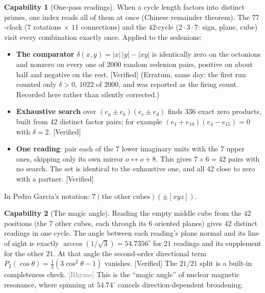 \documentclass[11pt]{article}
\newcommand{\verified}{\textsf{\small\textcolor{verif}{[Verified]}}}
\newcommand{\rhyme}{\textsf{\small\textcolor{gray}{[Rhyme]}}}
\theoremstyle{definition}\newtheorem{claim}{Capability}
\theoremstyle{remark}
\begin{document}
\begin{claim}[One-pass readings]\label{c:reading}
When a cycle length factors into distinct primes, one index reads all of them at once (Chinese remainder theorem). The $77$-clock ($7$ rotations $\times$ $11$ connections) and the $42$-cycle ($2\cdot3\cdot7$: sign, plane, cube) visit every combination exactly once. Applied to the sedenions:
\begin{itemize}[nosep]
\item \textbf{The comparator} $\delta(x,y)=|x|\,|y|-|xy|$ is identically zero on the octonions and nonzero on every one of $2000$ random sedenion pairs, positive on about half and negative on the rest. \verified{} (Erratum, same day: the first run counted only $\delta>0$, $1022$ of $2000$, and was reported as the firing count. Recorded here rather than silently corrected.)
\item \textbf{Exhaustive search} over $(e_a\pm e_b)(e_c\pm e_d)$ finds $336$ exact zero products, built from $42$ distinct factor pairs; for example $(e_1+e_{10})(e_4-e_{15})=0$ with $\delta=2$. \verified
\item \textbf{One reading}: pair each of the $7$ lower imaginary units with the $7$ upper ones, skipping only its own mirror $o\leftrightarrow o+8$. This gives $7\times6=42$ pairs with no search. The set is identical to the exhaustive one, and all $42$ close to zero with a partner. \verified
\end{itemize}
In Pedro Garcia's notation: $7(\text{the other cubes})(\pm[xyz])$.
\end{claim}

\begin{claim}[The magic angle]\label{c:magic}
Reading the empty middle cube from the $42$ positions (the $7$ other cubes, each through its $6$ oriented planes) gives $42$ distinct readings in one cycle. The angle between each reading's plane normal and its line of sight is exactly $\arccos(1/\sqrt3)=54.7356^\circ$ for $21$ readings and its supplement for the other $21$. At that angle the second-order directional term $P_2(\cos\theta)=\tfrac12(3\cos^2\theta-1)$ vanishes. \verified{} The $21/21$ split is a built-in completeness check. \rhyme{} This is the ``magic angle'' of nuclear magnetic resonance, where spinning at $54.74^\circ$ cancels direction-dependent broadening.
\end{claim}
\end{document}
